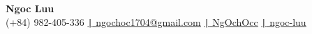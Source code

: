 \begin{center}
    \textbf{\Huge Ngoc Luu} \\ \vspace{5pt}
    \small (+84) 982-405-336 \quad
    \href{mailto:ngochoc1704@gmail.com}{\texttt{|} \quad \underline{ngochoc1704@gmail.com}}
    \href{https://github.com/NgOchOcc}{\texttt{|} \quad \underline{NgOchOcc}}
    \href{https://www.linkedin.com/in/ng%E1%BB%8Dc-l%C6%B0u-4b88b6263/}{\texttt{|} \quad \underline{ngoc-luu}}

\end{center}